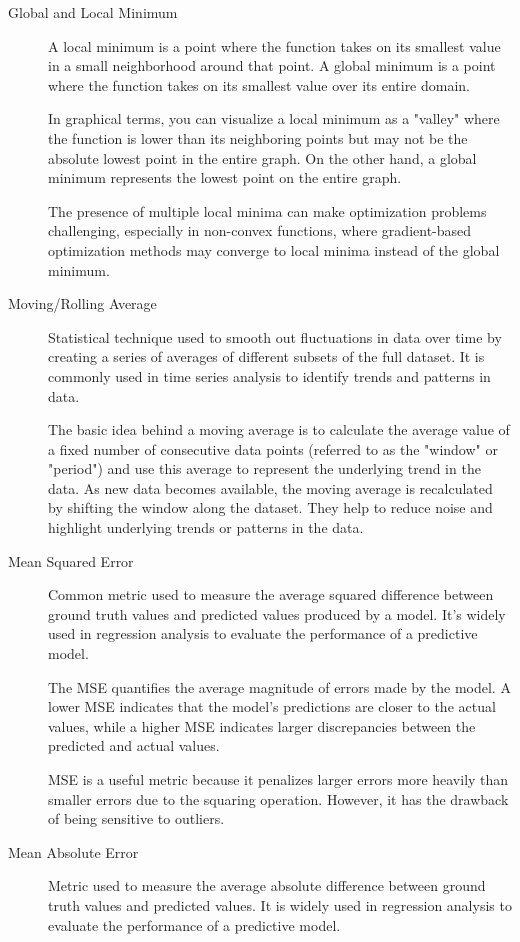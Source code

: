 \documentclass[a4paper]{report}
\begin{document}
\begin{description}
\item[Global and Local Minimum]
A local minimum is a point where the function takes on its smallest value in a small neighborhood around that point. A global minimum is a point where the function takes on its smallest value over its entire domain. 

In graphical terms, you can visualize a local minimum as a "valley" where the function is lower than its neighboring points but may not be the absolute lowest point in the entire graph. On the other hand, a global minimum represents the lowest point on the entire graph.

The presence of multiple local minima can make optimization problems challenging, especially in non-convex functions, where gradient-based optimization methods may converge to local minima instead of the global minimum.

\item[Moving/Rolling Average]
Statistical technique used to smooth out fluctuations in data over time by creating a series of averages of different subsets of the full dataset. It is commonly used in time series analysis to identify trends and patterns in data. 

The basic idea behind a moving average is to calculate the average value of a fixed number of consecutive data points (referred to as the "window" or "period") and use this average to represent the underlying trend in the data. As new data becomes available, the moving average is recalculated by shifting the window along the dataset. They help to reduce noise and highlight underlying trends or patterns in the data. 

\item[Mean Squared Error]
Common metric used to measure the average squared difference between ground truth values and predicted values produced by a model. It's widely used in regression analysis to evaluate the performance of a predictive model.

The MSE quantifies the average magnitude of errors made by the model. A lower MSE indicates that the model's predictions are closer to the actual values, while a higher MSE indicates larger discrepancies between the predicted and actual values.

MSE is a useful metric because it penalizes larger errors more heavily than smaller errors due to the squaring operation. However, it has the drawback of being sensitive to outliers.

\item[Mean Absolute Error]
Metric used to measure the average absolute difference between ground truth values and predicted values. It is widely used in regression analysis to evaluate the performance of a predictive model.


\end{description}
\end{document}
